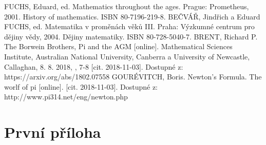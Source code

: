\documentclass[rocnikovka]{gzwroc} %
\begin{document}
\begin{oldthebibliography}{99}
FUCHS, Eduard, ed. Mathematics throughout the ages. Prague: Prometheus, 2001. History of mathematics. ISBN 80-7196-219-8.
BEČVÁŘ, Jindřich a Eduard FUCHS, ed. Matematika v proměnách věků III. Praha: Výzkumné centrum pro dějiny vědy, 2004. Dějiny matematiky. ISBN 80-728-5040-7.
BRENT, Richard P. The Borwein Brothers, Pi and the AGM [online]. Mathematical Sciences Institute, Australian National University, Canberra a University of Newcastle, Callaghan, 8. 8. 2018, , 7-8 [cit. 2018-11-03]. Dostupné z: https://arxiv.org/abs/1802.07558
GOURÉVITCH, Boris. Newton's Formula. The worlf of pi [online]. [cit. 2018-11-03]. Dostupné z: http://www.pi314.net/eng/newton.php
\end{oldthebibliography}
\newpage
\listoffigures
\listoftables
\newpage
\prilohy
\section{První příloha} %
\end{document}
